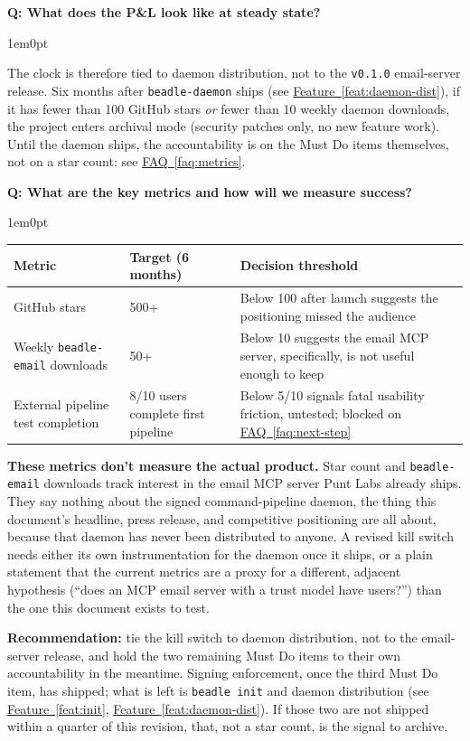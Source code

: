 \documentclass[11pt,letterpaper]{article}
\newcounter{faqnum}
\newenvironment{faqpair}[1]{%
  \needspace{4\baselineskip}%
  \vspace{0.5em}%
  \refstepcounter{faqnum}%
  \noindent\textbf{\color{SectionBlue}Q\thefaqnum: #1}\par\nopagebreak[4]%
  \vspace{0.2em}%
  \begin{adjustwidth}{1em}{0pt}%
  \setlength{\parindent}{0pt}%
}{%
  \end{adjustwidth}%
  \vspace{0.5em}%
}
\newcommand{\faqref}[1]{\hyperref[#1]{FAQ~\ref*{#1}}}
\newcommand{\featureref}[1]{\hyperref[#1]{Feature~\ref*{#1}}}
\begin{document}
\begin{faqpair}{What does the P\&L look like at steady state?}
  The clock is therefore tied to daemon distribution, not to the
  \texttt{v0.1.0} email-server release. Six months after \texttt{beadle-daemon}
  ships (see \featureref{feat:daemon-dist}), if it has fewer than 100 GitHub
  stars \textit{or} fewer than 10 weekly daemon downloads, the project enters
  archival mode (security patches only, no new feature work). Until the daemon
  ships, the accountability is on the Must Do items themselves, not on a star
  count: see \faqref{faq:metrics}.
\end{faqpair}

\begin{faqpair}{What are the key metrics and how will we measure success?}\label{faq:metrics}
  \begin{tabularx}{\linewidth}{@{} l l X @{}}
  \toprule
  \textbf{Metric} & \textbf{Target (6 months)} & \textbf{Decision threshold} \\
  \midrule
  GitHub stars & 500+ & Below 100 after launch suggests the positioning
    missed the audience \\
  Weekly \texttt{beadle-email} downloads & 50+ & Below 10 suggests the
    email MCP server, specifically, is not useful enough to keep \\
  External pipeline test completion & 8/10 users complete first pipeline &
    Below 5/10 signals fatal usability friction, untested; blocked on
    \faqref{faq:next-step} \\
  \bottomrule
  \end{tabularx}

  \vspace{0.5em}
  \textbf{These metrics don't measure the actual product.} Star count and
  \texttt{beadle-email} downloads track interest in the email MCP server
  Punt Labs already ships. They say nothing about the signed
  command-pipeline daemon, the thing this document's headline, press
  release, and competitive positioning are all about, because that
  daemon has never been distributed to anyone. A revised kill switch needs
  either its own instrumentation for the daemon once it ships, or a
  plain statement that the current metrics are a proxy for a different,
  adjacent hypothesis (``does an MCP email server with a trust model have
  users?'') than the one this document exists to test.

  \textbf{Recommendation:} tie the kill switch to daemon distribution, not
  to the email-server release, and hold the two remaining Must Do items to
  their own accountability in the meantime. Signing enforcement, once the
  third Must Do item, has shipped; what is left is {\small\texttt{beadle
  init}} and daemon distribution (see \featureref{feat:init},
  \featureref{feat:daemon-dist}). If those two are not shipped within a
  quarter of this revision, that, not a star count, is the signal to archive.


\end{faqpair}
\end{document}
